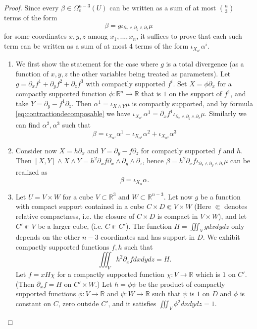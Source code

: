 \documentclass{article}
\newcommand{\R}{\mathbb{R}}
\theoremstyle{definition}
\begin{document}
\begin{proof}
Since every $\beta \in \Omega^{n-3}_{c}(U)$ can be written as a sum of at most $\binom{n}{3}$ terms of the form 
$$\beta=g\iota_{\partial_{x}\wedge\partial_{y}\wedge\partial_{z}}\mu$$ for some coordinates $x,y,z$ among $x_1,...,x_n$,
it suffices to prove that each such term can be written as a sum of at most 4 terms of the form $\iota_{X_{\alpha^i}}\alpha^i$.
\begin{enumerate}
    \item We first show the statement for the case where $g$ is a total divergence (as a function of $x,y,z$ the other variables being treated as parameters). Let $g= \partial_xf^1 + \partial_y f^2 +\partial_zf^3$ with compactly supported $f^i$.
   Set $X= \phi\partial_x$ for a compactly supported function $\phi \colon \R^n \rightarrow \R$ that is $1$ on the support of $f^1$, and take $Y=\partial_y-f^1\partial_z$. Then $\alpha^1=\iota_{X\wedge Y}\mu$ is 
   compactly supported, and by formula \eqref{eq:contractiondecomposable} we have $\iota_{X_{\alpha^1}}\alpha^1=\partial_xf^1\iota_{\partial_{x}\wedge\partial_{y}\wedge\partial_{z}}\mu$. Similarly we can find $\alpha^2, \alpha^3$ such that 
   $$
   \beta= \iota_{X_{\alpha^1}}\alpha^1+\iota_{X_{\alpha^2}}\alpha^2+\iota_{X_{\alpha^3}}\alpha^3
   $$

\item Consider now $X=h\partial_x$ and $Y=\partial_y-f\partial_z$ for compactly supported $f$ and $h$. Then $[X,Y]\wedge X\wedge Y=h^2\partial_xf{\partial_{x}\wedge\partial_{y}\wedge\partial_{z}}$, hence $\beta = h^2\partial_xf\iota_{\partial_{x}\wedge\partial_{y}\wedge\partial_{z}}\mu$ can be realized as 
\[
\beta = \iota_{X_\alpha}\alpha.
\]
   
   \item  
   Let $U=V\times W$ for a cube $V\subset \mathbb R^3$ and $W\subset \mathbb R^{n-3}$. Let now $g$ be a function with compact support contained in  a cube $C \times D \Subset V\times W$ (Here $\Subset$ denotes relative compactness, i.e. the closure of $C\times D$ is compact in $
   V\times W$), and let $C' \Subset V$ be a larger cube, (i.e. $C \Subset C'$). The function $H=\iiint_{V} gdxdydz$ only depends on the other $n-3$ coordinates and has support in $D$. We exhibit compactly supported functions $f, h$ such that \begin{equation}\label{eq:goededivergentie}
   \iiint_{V}h^2\partial_xf dxdydz = H.
   \end{equation}
   Let $f = x H \chi$ for a compactly supported function $\chi \colon V \rightarrow \R$ which is $1$ on $C'$. (Then $\partial_x f = H$ on $C' \times W$.) Let $h = \phi \psi$ be the product of compactly supported functions $\phi \colon V \rightarrow \R$  and $\psi \colon W \rightarrow \R$ such that $\psi$ is $1$ on $D$ and $\phi$ is constant on $C$, zero outside $C'$, and it satisfies $\iiint_{V}\phi^2 dxdydz = 1$.


\end{enumerate}
\end{proof}
\end{document}
